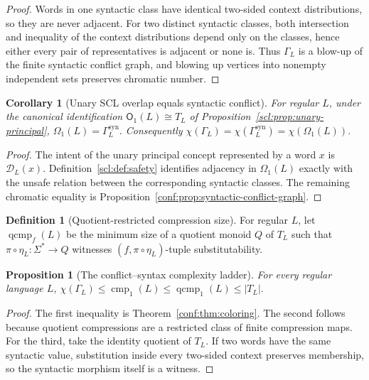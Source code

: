 \documentclass[10pt,a4paper]{article}
\newtheorem{proposition}[theorem]{Proposition}
\newtheorem{corollary}[theorem]{Corollary}
\theoremstyle{definition}
\newtheorem{definition}[theorem]{Definition}
\theoremstyle{remark}
\newcommand{\cmp}{\operatorname{cmp}}
\newcommand{\qcmp}{\operatorname{qcmp}}
\newcommand{\D}{\mathcal D}
\newcommand{\Obj}{\mathsf O}
\newcommand{\Om}{\Omega}
\begin{document}
\begin{proof}
Words in one syntactic class have identical two-sided context distributions,
so they are never adjacent. For two distinct syntactic classes, both
intersection and inequality of the context distributions depend only on the
classes, hence either every pair of representatives is adjacent or none is.
Thus \(\Gamma_L\) is a blow-up of the finite syntactic conflict graph, and
blowing up vertices into nonempty independent sets preserves chromatic number.
\end{proof}

\begin{corollary}[Unary SCL overlap equals syntactic conflict]
\label{conf:cor:omega-syntactic}
For regular \(L\), under the canonical identification
\(\Obj_1(L)\cong T_L\) of Proposition~\ref{scl:prop:unary-principal},
\(
 \Om_1(L)=\Gamma_L^{\mathrm{syn}}.
\)
Consequently
\(
 \chi(\Gamma_L)=\chi(\Gamma_L^{\mathrm{syn}})=\chi(\Om_1(L)).
\)
\end{corollary}
\begin{proof}
The intent of the unary principal concept represented by a word \(x\) is
\(\D_L(x)\).  Definition~\ref{scl:def:safety} identifies adjacency in
\(\Om_1(L)\) exactly with the unsafe relation between the corresponding
syntactic classes.  The remaining chromatic equality is
Proposition~\ref{conf:prop:syntactic-conflict-graph}.
\end{proof}

\begin{definition}[Quotient-restricted compression size]
For regular \(L\), let \(\qcmp_f(L)\) be the minimum size of a quotient
monoid \(Q\) of \(T_L\) such that \(\pi\circ\eta_L:\Sigma^*\to Q\) witnesses
\((f,\pi\circ\eta_L)\)-tuple substitutability.
\end{definition}

\begin{proposition}[The conflict--syntax complexity ladder]
\label{conf:prop:ladder}
For every regular language \(L\), \(\chi(\Gamma_L) \le \cmp_1(L) \le \qcmp_1(L) \le |T_L|.\) \end{proposition}

\begin{proof}
The first inequality is Theorem~\ref{conf:thm:coloring}. The second follows
because quotient compressions are a restricted class of finite compression maps.
For the third, take the identity quotient of \(T_L\). If two words have the
same syntactic value, substitution inside every two-sided context preserves
membership, so the syntactic morphism itself is a witness.
\end{proof}
\end{document}
